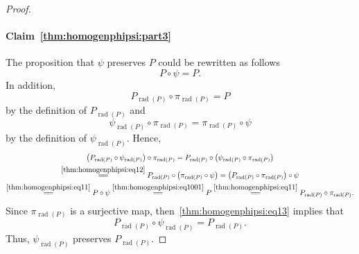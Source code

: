 \documentclass[10pt,a4paper]{amsart}
\DeclareMathOperator{\rad}{rad}
\begin{document}
\begin{proof}
\paragraph{Claim~\ref{thm:homogenphipsi:part3}}%
The proposition that $\psi$ preserves $P$ could be rewritten as follows
\begin{equation}\label{thm:homogenphipsi:eq1001}
P \circ \psi = P.
\end{equation}
In addition,
\begin{equation}\label{thm:homogenphipsi:eq11}
P_{\rad(P)} \circ  \pi_{\rad(P)} = P
\end{equation}
by the definition of $P_{\rad(P)}$ and 
\begin{equation}\label{thm:homogenphipsi:eq12}
\psi_{\rad(P)} \circ \pi_{\rad(P)} = \pi_{\rad(P)} \circ \psi
\end{equation}
by the definition of $\psi_{\rad(P)}$. Hence,
\begin{multline}\label{thm:homogenphipsi:eq13}
\left(P_{\rad(P)} \circ  \psi_{\rad(P)}\right) \circ \pi_{\rad(P)} = P_{\rad(P)} \circ  \left(\psi_{\rad(P)}\circ \pi_{\rad(P)}\right)\\
\overset{\eqref{thm:homogenphipsi:eq12}}{=\joinrel=} P_{\rad(P)} \circ  \left(\pi_{\rad(P)} \circ \psi \right)
= \left(P_{\rad(P)} \circ  \pi_{\rad(P)} \right) \circ \psi\\ \overset{\eqref{thm:homogenphipsi:eq11}}{=\joinrel=} P \circ \psi \overset{\eqref{thm:homogenphipsi:eq1001}}{=\joinrel=} P \overset{\eqref{thm:homogenphipsi:eq11}}{=\joinrel=} P_{\rad(P)} \circ  \pi_{\rad(P)}.
\end{multline}
Since $\pi_{\rad(P)}$ is a surjective map, then~\eqref{thm:homogenphipsi:eq13} implies that
\[
P_{\rad(P)} \circ  \psi_{\rad(P)} = P_{\rad(P)}.
\]
Thus, $\psi_{\rad(P)}$ preserves $P_{\rad(P)}$.



\end{proof}
\end{document}
